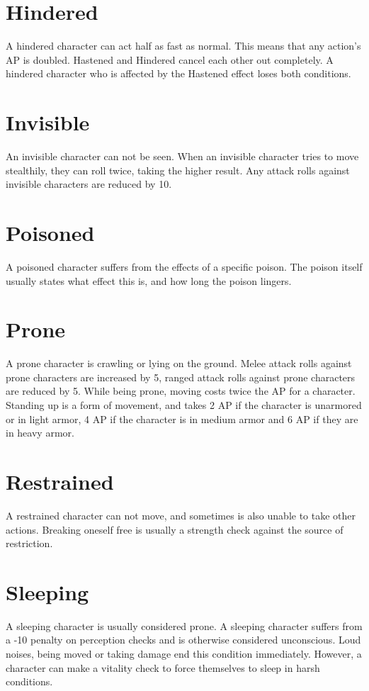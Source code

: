 \section{Hindered}
A hindered character can act half as fast as normal. This means that any action's AP is doubled. Hastened and Hindered cancel each other out completely. A hindered character who is affected by the Hastened effect loses both conditions.

\section{Invisible}
An invisible character can not be seen. When an invisible character tries to move stealthily, they can roll twice, taking the higher result. Any attack rolls against invisible characters are reduced by 10.

\section{Poisoned}
A poisoned character suffers from the effects of a specific poison. The poison itself usually states what effect this is, and how long the poison lingers.

\section{Prone}
A prone character is crawling or lying on the ground. Melee attack rolls against prone characters are increased by 5, ranged attack rolls against prone characters are reduced by 5. While being prone, moving costs twice the AP for a character.
Standing up is a form of movement, and takes 2 AP if the character is unarmored or in light armor, 4 AP if the character is in medium armor and 6 AP if they are in heavy armor.

\section{Restrained}
A restrained character can not move, and sometimes is also unable to take other actions. Breaking oneself free is usually a strength check against the source of restriction.

\section{Sleeping}
A sleeping character is usually considered prone. A sleeping character suffers from a -10 penalty on perception checks and is otherwise considered unconscious. Loud noises, being moved or taking damage end this condition immediately. However, a character can make a vitality check to force themselves to sleep in harsh conditions. 

